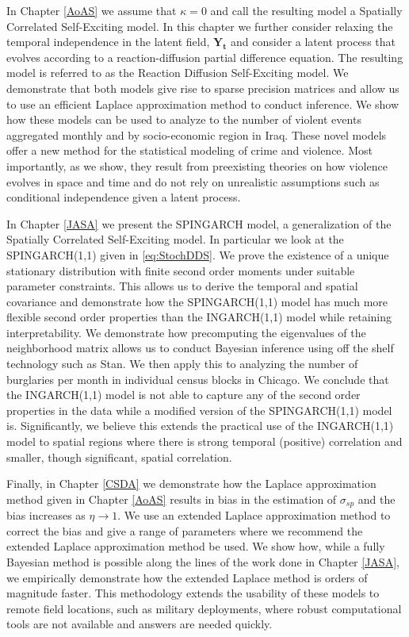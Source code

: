 \documentclass[11pt]{isuthesis}
\begin{document}
	In Chapter \ref{AoAS} we assume that $\kappa=0$ and call the resulting model a Spatially Correlated Self-Exciting model.  In this chapter we further consider relaxing the temporal independence in the latent field, $\boldsymbol{Y_t}$ and consider a latent process that evolves according to a reaction-diffusion partial difference equation.  The resulting model is referred to as the Reaction Diffusion Self-Exciting model.  We demonstrate that both models give rise to sparse precision matrices and allow us to use an efficient Laplace approximation method to conduct inference.  We show how these models can be used to analyze to the number of violent events aggregated monthly and by socio-economic region in Iraq.  These novel models offer a new method for the statistical modeling of crime and violence.  Most importantly, as we show, they result from preexisting theories on how violence evolves in space and time and do not rely on unrealistic assumptions such as conditional independence given a latent process.
	
	In Chapter \ref{JASA} we present the SPINGARCH model, a generalization of the Spatially Correlated Self-Exciting model.  In particular we look at the SPINGARCH(1,1) given in \eqref{eq:StochDDS}.  We prove the existence of a unique stationary distribution with finite second order moments under suitable parameter constraints.  This allows us to derive the temporal and spatial covariance and demonstrate how the SPINGARCH(1,1) model has much more flexible second order properties than the INGARCH(1,1) model while retaining interpretability.  We demonstrate how precomputing the eigenvalues of the neighborhood matrix allows us to conduct Bayesian inference using off the shelf technology such as Stan.  We then apply this to analyzing the number of burglaries per month in individual census blocks in Chicago.  We conclude that the INGARCH(1,1) model is not able to capture any of the second order properties in the data while a modified version of the SPINGARCH(1,1) model is.  Significantly, we believe this extends the practical use of the INGARCH(1,1) model to spatial regions where there is strong temporal (positive) correlation and smaller, though significant, spatial correlation.  
	
	Finally, in Chapter \ref{CSDA} we demonstrate how the Laplace approximation method given in Chapter \ref{AoAS} results in bias in the estimation of $\sigma_{sp}$ and the bias increases as $\eta \to 1$.  We use an extended Laplace approximation method to correct the bias and give a range of parameters where we recommend the extended Laplace approximation method be used.  We show how, while a fully Bayesian method is possible along the lines of the work done in Chapter \ref{JASA}, we empirically demonstrate how the extended Laplace method is orders of magnitude faster.  This methodology extends the usability of these models to remote field locations, such as military deployments, where robust computational tools are not available and answers are needed quickly.
	
\end{document}
